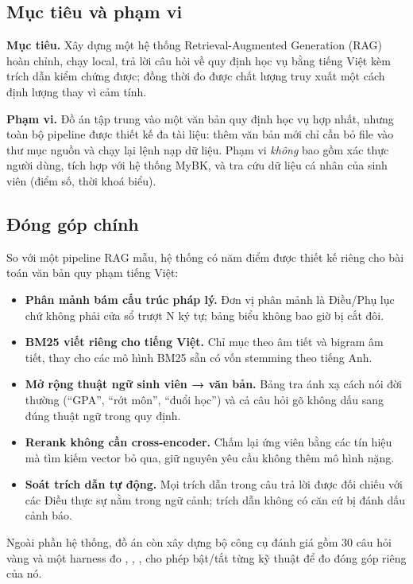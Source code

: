 \subsection{Mục tiêu và phạm vi}

\textbf{Mục tiêu.} Xây dựng một hệ thống Retrieval-Augmented Generation (RAG) hoàn chỉnh, chạy
local, trả lời câu hỏi về quy định học vụ bằng tiếng Việt kèm trích dẫn kiểm chứng được; đồng
thời đo được chất lượng truy xuất một cách định lượng thay vì cảm tính.

\textbf{Phạm vi.} Đồ án tập trung vào một văn bản quy định học vụ hợp nhất, nhưng toàn bộ
pipeline được thiết kế đa tài liệu: thêm văn bản mới chỉ cần bỏ file vào thư mục nguồn và chạy
lại lệnh nạp dữ liệu. Phạm vi \emph{không} bao gồm xác thực người dùng, tích hợp với hệ thống
MyBK, và tra cứu dữ liệu cá nhân của sinh viên (điểm số, thời khoá biểu).

\subsection{Đóng góp chính}

So với một pipeline RAG mẫu, hệ thống có năm điểm được thiết kế riêng cho bài toán văn bản quy
phạm tiếng Việt:

\begin{itemize}
  \item \textbf{Phân mảnh bám cấu trúc pháp lý.} Đơn vị phân mảnh là Điều/Phụ lục chứ không
  phải cửa sổ trượt N ký tự; bảng biểu không bao giờ bị cắt đôi.
  \item \textbf{BM25 viết riêng cho tiếng Việt.} Chỉ mục theo âm tiết và bigram âm tiết, thay
  cho các mô hình BM25 sẵn có vốn stemming theo tiếng Anh.
  \item \textbf{Mở rộng thuật ngữ sinh viên → văn bản.} Bảng tra ánh xạ cách nói đời thường
  (“GPA”, “rớt môn”, “đuổi học”) và cả câu hỏi gõ không dấu sang đúng thuật ngữ trong quy định.
  \item \textbf{Rerank không cần cross-encoder.} Chấm lại ứng viên bằng các tín hiệu mà tìm
  kiếm vector bỏ qua, giữ nguyên yêu cầu không thêm mô hình nặng.
  \item \textbf{Soát trích dẫn tự động.} Mọi trích dẫn trong câu trả lời được đối chiếu với các
  Điều thực sự nằm trong ngữ cảnh; trích dẫn không có căn cứ bị đánh dấu cảnh báo.
\end{itemize}

Ngoài phần hệ thống, đồ án còn xây dựng bộ công cụ đánh giá gồm 30 câu hỏi vàng và một harness
đo , , , cho phép bật/tắt từng kỹ thuật để đo đóng góp
riêng của nó.

\chapterbreak
